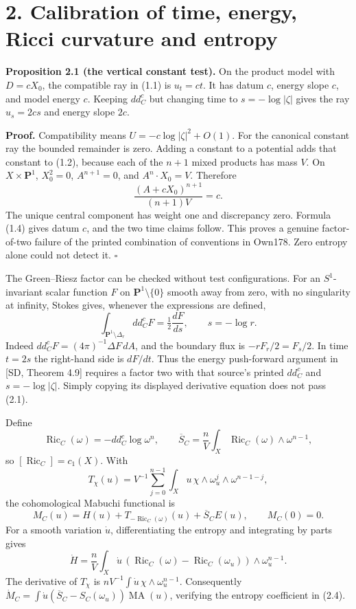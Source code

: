 \documentclass[
  11pt,
]{article}
\begin{document}
\section{2. Calibration of time, energy, Ricci curvature and
entropy}\label{calibration-of-time-energy-ricci-curvature-and-entropy}

\textbf{Proposition 2.1 (the vertical constant test).} On the product
model with \(D=cX_0\), the compatible ray in (1.1) is \(u_t=ct\). It has
datum \(c\), energy slope \(c\), and model energy \(c\). Keeping
\(dd^c_C\) but changing time to \(s=-\log|\zeta|\) gives the ray
\(u_s=2cs\) and energy slope \(2c\).

\textbf{Proof.} Compatibility means \(U=-c\log|\zeta|^2+O(1)\). For the
canonical constant ray the bounded remainder is zero. Adding a constant
to a potential adds that constant to (1.2), because each of the \(n+1\)
mixed products has mass \(V\). On \(X\times\mathbf P^1\), \(X_0^2=0\),
\(A^{n+1}=0\), and \(A^n\cdot X_0=V\). Therefore \[
 \frac{(A+cX_0)^{n+1}}{(n+1)V}=c.                         \tag{2.1}
\] The unique central component has weight one and discrepancy zero.
Formula (1.4) gives datum \(c\), and the two time claims follow. This
proves a genuine factor-of-two failure of the printed combination of
conventions in Own178. Zero entropy alone could not detect it.
\(\square\)

The Green--Riesz factor can be checked without test configurations. For
an \(S^1\)-invariant scalar function \(F\) on
\(\mathbf P^1\setminus\{0\}\) smooth away from zero, with no singularity
at infinity, Stokes gives, whenever the expressions are defined, \[
 \int_{\mathbf P^1\setminus\Delta_r}dd^c_CF
 =\tfrac12\frac{dF}{ds},\qquad s=-\log r.
                                                               \tag{2.2}
\] Indeed \(dd^c_CF=(4\pi)^{-1}\Delta F\,dA\), and the boundary flux is
\(-rF_r/2=F_s/2\). In time \(t=2s\) the right-hand side is \(dF/dt\).
Thus the energy push-forward argument in {[}SD, Theorem 4.9{]} requires
a factor two with that source's printed \(dd^c_C\) and
\(s=-\log|\zeta|\). Simply copying its displayed derivative equation
does not pass (2.1).

Define \[
 \operatorname{Ric}_C(\omega)=-dd^c_C\log\omega^n,\qquad
 \overline S_C=\frac nV\int_X\operatorname{Ric}_C(\omega)\wedge\omega^{n-1},
\] so \([\operatorname{Ric}_C]=c_1(X)\). With \[
 T_\chi(u)=V^{-1}\sum_{j=0}^{n-1}\int_Xu\,\chi\wedge\omega_u^j\wedge\omega^{n-1-j},
                                                               \tag{2.3}
\] the cohomological Mabuchi functional is \[
 M_C(u)=H(u)+T_{-\operatorname{Ric}_C(\omega)}(u)+\overline S_C E(u),
 \qquad M_C(0)=0.                                             \tag{2.4}
\] For a smooth variation \(\dot u\), differentiating the entropy and
integrating by parts gives \[
 \dot H=\frac nV\int_X\dot u\,
     (\operatorname{Ric}_C(\omega)-\operatorname{Ric}_C(\omega_u))
        \wedge\omega_u^{n-1}.
\] The derivative of \(T_\chi\) is
\(nV^{-1}\int\dot u\,\chi\wedge\omega_u^{n-1}\). Consequently
\(\dot M_C=\int\dot u(\overline S_C-S_C(\omega_u))\operatorname{MA}(u)\),
verifying the entropy coefficient in (2.4).
\end{document}
